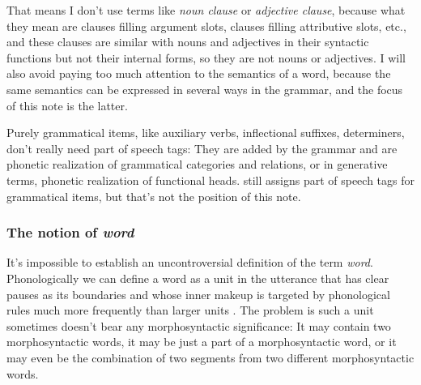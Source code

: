\documentclass[UTF8, a4paper, oneside, scheme=plain]{ctexrep}
\newcommand*{\citesec}[1]{\S~{#1}}
\newcommand*{\term}[1]{\emph{#1}}
\begin{document}
That means I don't use terms like \term{noun clause} or \term{adjective clause},
because what they mean are clauses filling argument slots, 
clauses filling attributive slots, etc.,
and these clauses are similar with nouns and adjectives in their syntactic functions 
but not their internal forms,
so they are not nouns or adjectives.
I will also avoid paying too much attention to the semantics of a word,
because the same semantics can be expressed in several ways in the grammar,
and the focus of this note is the latter.

Purely grammatical items, like auxiliary verbs, inflectional suffixes, determiners,
don't really need part of speech tags:
They are added by the grammar and are phonetic realization of grammatical categories and relations,
or in generative terms, phonetic realization of functional heads.
\citet{cgel} still assigns part of speech tags for grammatical items,
but that's not the position of this note.

\subsubsection{The notion of \term{word}}\label{sec:wordhood}

It's impossible to establish an uncontroversial definition of the term \term{word}.
Phonologically we can define a word as a unit in the utterance
that has clear pauses as its boundaries and 
whose inner makeup is targeted by phonological rules much more frequently
than larger units \citep[\citesec{10.3}]{dixon2010basic2}.
The problem is such a unit sometimes doesn't bear any morphosyntactic significance:
It may contain two morphosyntactic words,
it may be just a part of a morphosyntactic word,
or it may even be the combination of two segments from two different morphosyntactic words.
\end{document}
